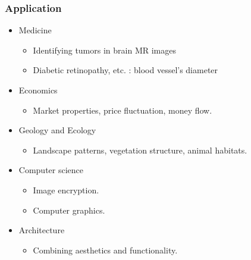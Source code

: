 \begin{frame}
	\frametitle{Application}
	\begin{itemize}
		\item Medicine
		\begin{itemize}
			\item Identifying tumors in brain MR images \cite{iftekharuddin2003fractal}
			\item Diabetic retinopathy, etc. : blood vessel's diameter \cite{uahabi2015applications}
		\end{itemize}
		\item Economics
		\begin{itemize}
			\item Market properties, price fluctuation, money flow. \cite{takayasu2009fractals}
		\end{itemize}
		\item Geology and Ecology
		\begin{itemize}
			\item Landscape patterns, vegetation structure, animal habitats. \cite{LOEHLE1996271}
		\end{itemize}
		\item Computer science
		\begin{itemize}
			\item Image encryption. \cite{sangavi2019image}
			\item Computer graphics. \cite{sala2021fractal}
		\end{itemize}
		\item Architecture
		\begin{itemize}
			\item Combining aesthetics and functionality. \cite{lorenz2002fractals}
		\end{itemize}
	\end{itemize}
\end{frame}

